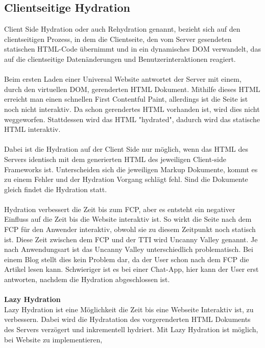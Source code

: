 \documentclass[runningheads]{llncs}
\numberwithin{figure}{section}
\begin{document}
\subsection{Clientseitige Hydration}
\label{subsec:Clientseitige Hydration}
Client Side Hydration oder auch Rehydration genannt, 
bezieht sich auf den clientseitigen Prozess, 
in dem die Clientseite, 
den vom Server gesendeten statischen HTML-Code übernimmt und 
in ein dynamisches DOM verwandelt, 
das auf die clientseitige Datenänderungen und Benutzerinteraktionen reagiert. 
\\
\\
Beim ersten Laden einer Universal Website antwortet der Server mit einem, 
durch den virtuellen DOM, gerenderten HTML Dokument. 
Mithilfe dieses HTML erreicht man einen schnellen First Contentful Paint, 
allerdings ist die Seite ist noch nicht interaktiv. 
Da schon gerendertes HTML vorhanden ist, 
wird dies nicht weggeworfen. Stattdessen wird das HTML "hydrated", 
dadurch wird das statische HTML interaktiv. 
\\
\\
Dabei ist die Hydration auf der Client Side nur möglich, 
wenn das HTML des Servers identisch mit dem generierten HTML des jeweiligen 
Client-side Frameworks ist. 
Unterscheiden sich die jeweiligen Markup Dokumente, 
kommt es zu einem Fehler und der Hydration Vorgang schlägt fehl. 
Sind die Dokumente gleich findet die Hydration statt.
\\
\\
Hydration verbessert die Zeit bis zum FCP, 
aber es entsteht ein negativer Einfluss auf die Zeit bis die Website interaktiv ist. 
So wirkt die Seite nach dem FCP für den Anwender interaktiv, 
obwohl sie zu diesem Zeitpunkt noch statisch ist. 
Diese Zeit zwischen dem FCP und der TTI wird Uncanny Valley genannt. 
Je nach Anwendungsart ist das Uncanny Valley unterschiedlich problematisch. 
Bei einem Blog stellt dies kein Problem dar, 
da der User schon nach dem FCP die Artikel lesen kann. 
Schwieriger ist es bei einer Chat-App, 
hier kann der User erst antworten, 
nachdem die Hydration abgeschlossen ist. \cite{vue.jsserver-sideguide} \cite{arunoda}
\\
\\
\textbf{Lazy Hydration}
\\
Lazy Hydration ist eine Möglichkeit die Zeit bis eine Webseite Interaktiv ist, 
zu verbessern. Dabei wird die Hydratation des vorgerenderten HTML Dokuments des Servers verzögert und 
inkrementell hydriert. Mit Lazy Hydration ist möglich, 
bei Website zu implementieren, 
\end{document}
